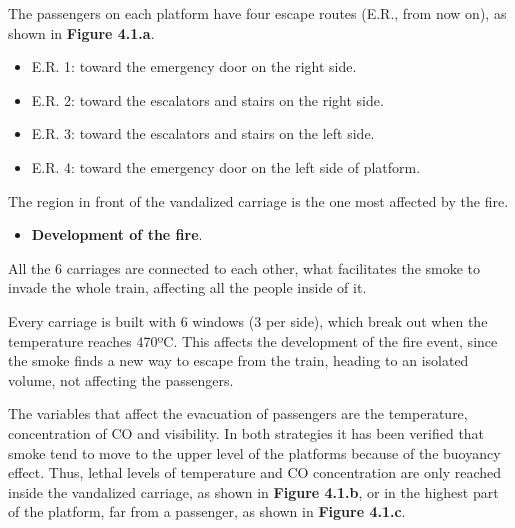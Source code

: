 \documentclass{article}
\begin{document}
\noindent{}The passengers on each platform have four escape routes (E.R., from now on), as shown 
in \textbf{Figure 4.1.a}.%

\begin{itemize}[noitemsep,topsep=\mdcompacttopsep]%

\item{}E.R. 1: toward the emergency door on the right side.%

\item{}E.R. 2: toward the escalators and stairs on the right side.%

\item{}E.R. 3: toward the escalators and stairs on the left side.%

\item{}E.R. 4: toward the emergency door on the left side of platform.%
\end{itemize}%

\noindent{}The region in front of the vandalized carriage is the one most affected by the fire.%

\begin{itemize}[noitemsep,topsep=\mdcompacttopsep]%

\item{}\textbf{Development of the fire}.%
\end{itemize}%

\noindent{}All the 6 carriages are connected to each other, what facilitates the smoke to invade 
the whole train, affecting all the people inside of it.%

Every carriage is built with 6 windows (3 per side), which break out when the temperature 
reaches 470ºC. This affects the development of the fire event, since the smoke finds a 
new way to escape from the train, heading to an isolated volume, not affecting the passengers.%

The variables that affect the evacuation of passengers are the temperature, concentration of CO 
and visibility.  In both strategies it has been verified that smoke tend to move to the 
upper level of the platforms because of the buoyancy effect. Thus, lethal levels of 
temperature and CO concentration are only reached inside the vandalized carriage, as 
shown in \textbf{Figure 4.1.b}, or in the highest part of the platform, far from a passenger, 
as shown in \textbf{Figure 4.1.c}.%
\end{document}
